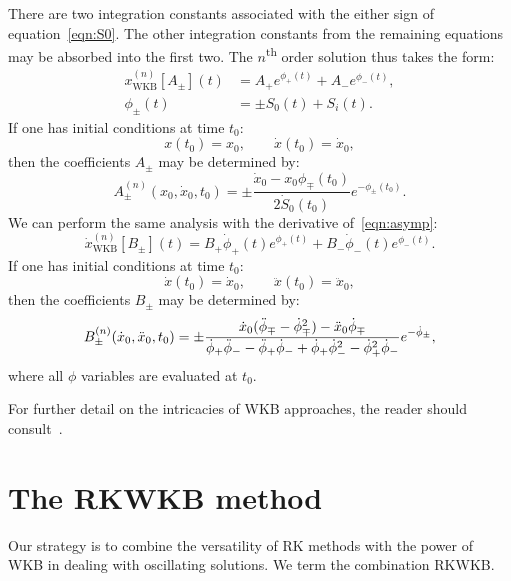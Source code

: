 There are two integration constants associated with the either sign of equation~\eqref{eqn:S0}. The other integration constants from the remaining equations may be absorbed into the first two. The \(n\)\textsuperscript{th} order solution thus takes the form:
\begin{align}       
  x_\mathrm{WKB}^{(n)}[A_{\pm}](t) &=
  A_{+} e^{\phi_+(t)} + A_{-} e^{\phi_-(t)},
  \label{eqn:solution} \\
  \phi_\pm(t) &= \pm S_0(t) + S_i(t).
  \label{eqn:phidef} 
\end{align}
If one has initial conditions at time \(t_0\):
\begin{equation}
  x(t_0) = x_0, \qquad \dot{x}(t_0)=\dot{x}_0,
  \label{eqn:i_c}
\end{equation}
then the coefficients \(A_\pm\) may be determined by:
\begin{equation}
  A_\pm^{(n)}(x_0,\dot{x}_0,t_0) = \pm\frac{\dot{x}_0 - x_0 \phi_\mp(t_0)}{2\dot{S}_0(t_0)} e^{-\phi_\pm(t_0)}.
  \label{eqn:i_c_Apm}
\end{equation}
We can perform the same analysis with the derivative of~\eqref{eqn:asymp}:
\begin{equation}       
  \dot{x}_\mathrm{WKB}^{(n)}[B_{\pm}](t) =
  B_{+} \dot{\phi}_+(t)e^{\phi_+(t)} + B_{-} \dot{\phi}_-(t)e^{\phi_-(t)}.
  \label{eqn:solution_xdot}
\end{equation}
If one has initial conditions at time \(t_0\):
\begin{equation}
  \dot{x}(t_0) = \dot{x}_0, \qquad \ddot{x}(t_0)=\ddot{x}_0,
  \label{eqn:i_c_xdot}
\end{equation}
then the coefficients \(B_\pm\) may be determined by:
\begin{equation}
  B_\pm^{(n)}(\dot{x}_0,\ddot{x}_0,t_0) = 
  \pm\frac{%
    \dot{x}_0(\ddot{\phi}_\mp- \dot{\phi}_\mp^2)-\ddot{x}_0 \dot{\phi}_\mp
  }{%
    \dot{\phi}_+ \ddot{\phi}_- -\ddot{\phi}_+ \dot{\phi}_- +\dot{\phi}_+ \dot{\phi}_-^2-\dot{\phi}_+^2 \dot{\phi}_-} e^{-\dot{\phi}_\pm},
  \label{eqn:i_c_Bpm}
\end{equation}
where all \(\phi\) variables are evaluated at \(t_0\).


For further detail on the intricacies of WKB approaches, the reader should consult~\cite{RHB,Bender+2010}.

\section{The RKWKB method}
Our strategy is to combine the versatility of RK methods with the power of WKB in dealing with oscillating solutions. We term the combination RKWKB\@.

